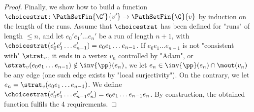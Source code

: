 \documentclass[10pt,a4paper]{amsart}
\begin{document}
\begin{proof}
Finally, we show how to build a function $\choicestrat \colon \PathSetFin{\G'}{v'} \to \PathSetFin{\G}{v}$ by induction on the length of the runs. Assume that $\choicestrat$ has been defined for "runs" of length $\leq n$, and let $e_0'e_1'\dots e_n'$ be a run of length $n+1$, with $\choicestrat(e_0'e_1'\dots e_{n-1}') = e_0e_1\dots e_{n-1}$. If $e_0e_1\dots e_{n-1}$ is not "consistent with" $\strat_v$, it ends in a vertex $v_n$ controlled by "Adam", or $\strat_v(e_0e_1\dots e_{n-1})\notin \inv{\pp}(e_n)$,  we let $e_n\in \inv{\pp}(e_n)\cap \mout(v_n)$ be any edge (one such edge exists by "local surjectivity"). 
On the contrary, we let $e_n = \strat_v(e_0e_1\dots e_{n-1})$.
We define $\choicestrat(e_0'e_1'\dots e_{n-1}'e_n') = e_0e_1\dots e_{n-1}e_n$. 
By construction, the obtained function fulfils the 4 requirements.
\end{proof}
\end{document}
